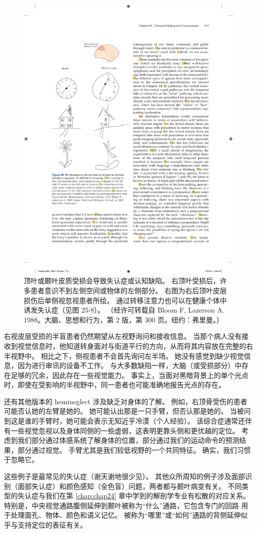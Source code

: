 \begin{figure}[htbp]
	\centering
	\includegraphics[width=0.5\linewidth]{chap56/fig_56_10}
	\caption{顶叶或颞叶皮质受损会导致失认症或认知缺陷。 右顶叶受损后，许多患者意识不到左侧空间或物体的左侧部分。 右图为右后顶叶皮层损伤后单侧视忽视患者所绘。 通过转移注意力也可以在健康个体中诱发失认症（见图 25-8）。 （经许可转载自 Bloom F, Lazerson A. 1988。大脑、思想和行为，第 2 版，第 300 页。纽约：弗里曼。）}
	\label{fig:56_10}
\end{figure}

右视皮层受损的半盲患者仍然期望从左视野询问和接收信息。 当那个病人没有接收到视觉信息时，他知道转身面对与街道平行的方向，从而将其内容放在完整的右半视野中。 相比之下，侧视患者不会首先询问左半场。 她没有感觉到缺少视觉信息，因为进行审讯的设备不工作。 与大多数缺陷一样，大脑（或受损部分）中存在足够的冗余，因此存在一些视觉能力。 事实上，当面对黑暗背景上的单个光点时，即使在受影响的半视野中，同一患者也可能准确地报告光点的存在。

还有其他版本的 hemineglect 涉及缺乏对身体的了解。 例如，右顶骨受伤的患者可能否认她的左臂是她的。 她可能认出那是一只手臂，但否认那是她的。 当被问到这是谁的手臂时，她可能会表示无知近乎冷漠（个人经验）。 该综合症通常还伴有一些视觉忽视以及身体同侧的一些虚弱，这表明更靠头侧和更优越的定位。 考虑到我们部分通过体感系统了解身体的位置，部分通过我们的运动命令的预测结果，部分通过视觉。 手臂尤其是我们较低视野的一个共同特征。 确实，我们习惯于忽略它。

这些例子是最常见的失认症（谢天谢地很少见）。 其他众所周知的例子涉及面部识别（面部失认症）和颜色感知（全色盲）问题，两者都与颞叶病变有关。 不同类型的失认症与我们在第 \ref{chap:chap24} 章中学到的解剖学专业有松散的对应关系。特别是，中央视觉通路腹侧延伸到颞叶被称为“什么”通路，它包含专门的回路 用于处理面孔、物体、颜色和语义记忆。 被称为“哪里”或“如何”通路的背侧延伸似乎与支持定位的表征有关。

